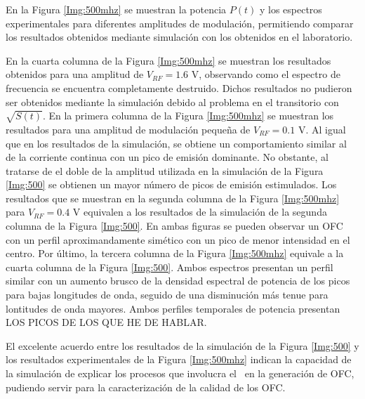 		En la Figura \ref{Img:500mhz} se muestran la potencia $P(t)$ y los espectros experimentales para diferentes amplitudes de modulación, permitiendo comparar los resultados obtenidos mediante simulación con los obtenidos en el laboratorio.

		En la cuarta columna de la Figura \ref{Img:500mhz} se muestran los resultados obtenidos para una amplitud de $V_{RF} = 1.6$ V, observando como el espectro de frecuencia se encuentra completamente destruido. Dichos resultados no pudieron ser obtenidos mediante la simulación debido al problema en el transitorio con $\sqrt{S(t)}$. En la primera columna de la Figura \ref{Img:500mhz} se muestran los resultados para una amplitud de modulación pequeña de $V_{RF} = 0.1$ V. Al igual que en los resultados de la simulación, se obtiene un comportamiento similar al de la corriente continua con un pico de emisi\'on dominante. No obstante, al tratarse de el doble de la amplitud utilizada en la simulaci\'on de la Figura \ref{Img:500} se obtienen un mayor n\'umero de picos de emisión estimulados. Los resultados que se muestran en la segunda columna de la Figura \ref{Img:500mhz}  para $V_{RF} = 0.4$ V equivalen a los resultados de la simulación de la segunda columna de la Figura \ref{Img:500}. En ambas figuras se pueden observar un OFC con un perfil aproximandamente sim\'etico con un pico de menor intensidad en el centro. Por \'ultimo, la tercera columna de la Figura \ref{Img:500mhz} equivale a la cuarta columna de la Figura \ref{Img:500}. Ambos espectros presentan un perfil similar con un aumento brusco de la densidad espectral de potencia de los picos para bajas longitudes de onda, seguido de una disminuci\'on m\'as tenue para lontitudes de onda mayores. Ambos perfiles temporales de potencia presentan LOS PICOS DE LOS QUE HE DE HABLAR.

	El excelente acuerdo entre los resultados de la simulaci\'on de la Figura \ref{Img:500} y los resultados experimentales de la Figura \ref{Img:500mhz} indican la capacidad de la simulaci\'on de explicar los procesos que involucra el \gs\ en la generaci\'on de OFC, pudiendo servir para la caracterizaci\'on de la calidad de los OFC.
